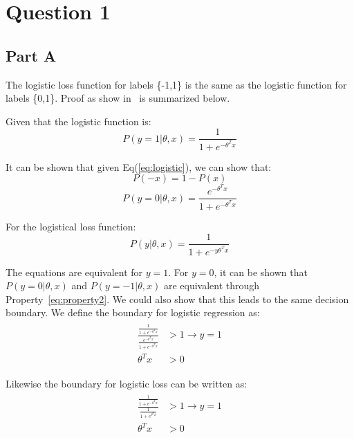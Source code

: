 \documentclass[11pt]{article}
\begin{document}
\section*{Question 1}
\subsection*{Part A}

The logistic loss function for labels \{-1,1\} is the same as the logistic function for labels \{0,1\}. 
Proof as show in~\cite{logisticloss} is summarized below.

Given that the logistic function is:
\begin{equation}
		P(y=1 | \theta, x) = \frac{1}{1+e^{-\theta^Tx}}
		\label{eq:logistic}
\end{equation}

It can be shown that given Eq(\ref{eq:logistic}), we can show that: 
\begin{equation}
		P(-x) = 1 - P(x)
\label{eq:property2}
\end{equation}
\begin{equation}
		P(y=0 | \theta, x) = \frac{e^{-\theta^Tx}}{1+e^{-\theta^Tx}}
\end{equation}

For the logistical loss function:
\begin{equation}
		P(y | \theta, x) = \frac{1}{1+e^{-y\theta^Tx}}
		\label{eq:loss}
\end{equation}

The equations are equivalent for $y=1$. For $y=0$, it can be shown that $P(y=0|\theta, x)$ and 
$P(y=-1|\theta,x)$ are equivalent through Property~\ref{eq:property2}. We could also show that
this leads to the same decision boundary. We define the boundary for logistic regression as:
\begin{align}
		\begin{split}
				\frac{\frac{1}{1+e^{-\theta^Tx}}}{\frac{e^{-\theta^Tx}}{1+e^{-\theta^Tx}}} &> 1 \rightarrow y=1 \\
		\theta^Tx &> 0 
		\end{split}
\end{align}

Likewise the boundary for logistic loss can be written as:
\begin{align}
		\begin{split}
				\frac{\frac{1}{1+e^{-\theta^Tx}}}{\frac{1}{1+e^{\theta^Tx}}} &> 1 \rightarrow y=1 \\
		\theta^Tx &> 0
		\end{split}
\end{align}
\end{document}
